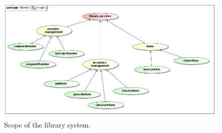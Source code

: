  \begin{figure}[htb]
  \includegraphics[width=1.0\textwidth]{scope}
 \caption{Scope of the library system.\label{libraryScope_fig}}
 \end{figure}
